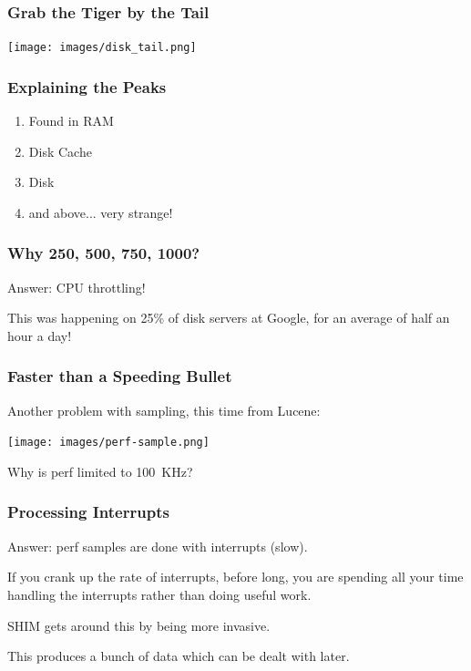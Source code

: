 \begin{frame}
\frametitle{Grab the Tiger by the Tail}

\begin{center}
	\texttt{[image: images/disk\_tail.png]}
\end{center}

\end{frame}



\begin{frame}
\frametitle{Explaining the Peaks}

\begin{enumerate}
	\item Found in RAM
	\item Disk Cache
	\item Disk
	\item and above... very strange!
\end{enumerate}

\end{frame}



\begin{frame}
\frametitle{Why 250, 500, 750, 1000?}

Answer: CPU throttling!

This was happening on 25\% of disk servers at Google, for an average of half an hour a day!

\end{frame}



\begin{frame}
\frametitle{Faster than a Speeding Bullet}

Another problem with sampling,
this time from Lucene:

\begin{center}
	\texttt{[image: images/perf-sample.png]}
\end{center}

Why is perf limited to 100~KHz?

\end{frame}



\begin{frame}
\frametitle{Processing Interrupts}

Answer: perf samples are done with interrupts (slow). 

If you crank up the rate of interrupts, before long, you are spending all your time handling the interrupts rather than doing useful work.

SHIM gets around this by being more invasive.

This produces a bunch of data which can be dealt with later.

\end{frame}

